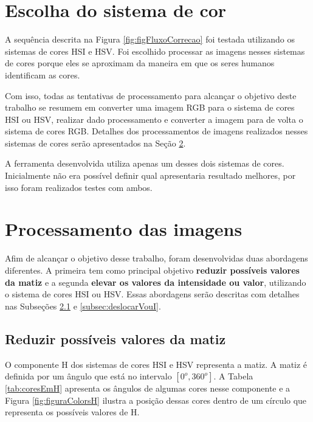\documentclass[	12pt, Times, openright, twoside, a4paper, english, brazil]{abntex2}
\begin{document}
\section{Escolha do sistema de cor}

A sequência descrita na Figura \ref{fig:figFluxoCorrecao} foi testada utilizando os sistemas de cores HSI e HSV. Foi escolhido processar as imagens nesses sistemas de cores porque eles se aproximam da maneira em que os seres humanos identificam as cores. 

Com isso, todas as tentativas de processamento para alcançar o objetivo deste trabalho se resumem em converter uma imagem RGB para o sistema de cores HSI ou HSV, realizar dado processamento e converter a imagem para de volta o sistema de cores RGB. Detalhes dos processamentos de imagens realizados nesses sistemas de cores serão apresentados na Seção \ref{sec:processamentoDasImagens}.

A ferramenta desenvolvida utiliza apenas um desses dois sistemas de cores. Inicialmente não era possível definir qual apresentaria resultado melhores, por isso foram realizados testes com ambos.


\section{Processamento das imagens}
\label{sec:processamentoDasImagens}

Afim de alcançar o objetivo desse trabalho, foram desenvolvidas duas abordagens diferentes. A primeira tem como principal objetivo \textbf{reduzir possíveis valores da matiz} e a segunda \textbf{elevar os valores da intensidade ou valor}, utilizando o sistema de cores HSI ou HSV. Essas abordagens serão descritas com detalhes nas Subseções \ref{subsec:deslocarH} e \ref{subsec:deslocarVouI}.

\subsection{Reduzir possíveis valores da matiz}
\label{subsec:deslocarH}

O componente H dos sistemas de cores HSI e HSV representa a matiz. A matiz é definida por um ângulo que está no intervalo $[0^o, 360^o]$. A Tabela \ref{tab:coresEmH} apresenta os ângulos de algumas cores nesse componente e a Figura \ref{fig:figuraColorsH} ilustra a posição dessas cores dentro de um círculo que representa os possíveis valores de H.
\end{document}
